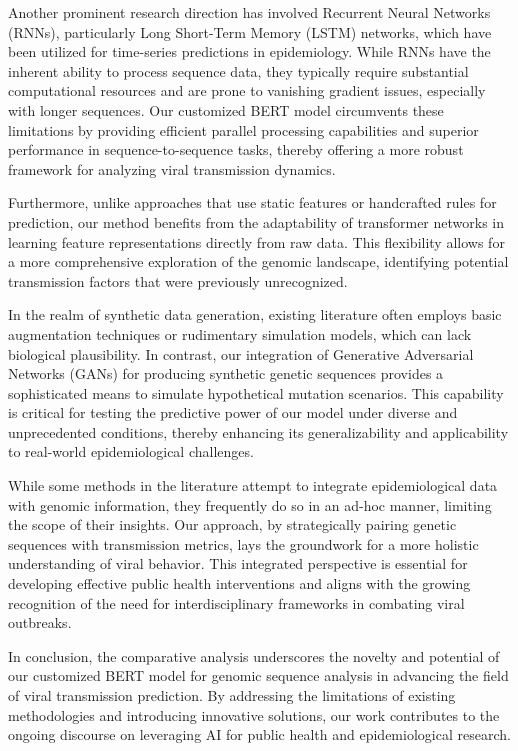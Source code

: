 \documentclass{article}
\begin{document}
Another prominent research direction has involved Recurrent Neural Networks (RNNs), particularly Long Short-Term Memory (LSTM) networks, which have been utilized for time-series predictions in epidemiology. While RNNs have the inherent ability to process sequence data, they typically require substantial computational resources and are prone to vanishing gradient issues, especially with longer sequences. Our customized BERT model circumvents these limitations by providing efficient parallel processing capabilities and superior performance in sequence-to-sequence tasks, thereby offering a more robust framework for analyzing viral transmission dynamics.

Furthermore, unlike approaches that use static features or handcrafted rules for prediction, our method benefits from the adaptability of transformer networks in learning feature representations directly from raw data. This flexibility allows for a more comprehensive exploration of the genomic landscape, identifying potential transmission factors that were previously unrecognized.

In the realm of synthetic data generation, existing literature often employs basic augmentation techniques or rudimentary simulation models, which can lack biological plausibility. In contrast, our integration of Generative Adversarial Networks (GANs) for producing synthetic genetic sequences provides a sophisticated means to simulate hypothetical mutation scenarios. This capability is critical for testing the predictive power of our model under diverse and unprecedented conditions, thereby enhancing its generalizability and applicability to real-world epidemiological challenges.

While some methods in the literature attempt to integrate epidemiological data with genomic information, they frequently do so in an ad-hoc manner, limiting the scope of their insights. Our approach, by strategically pairing genetic sequences with transmission metrics, lays the groundwork for a more holistic understanding of viral behavior. This integrated perspective is essential for developing effective public health interventions and aligns with the growing recognition of the need for interdisciplinary frameworks in combating viral outbreaks.

In conclusion, the comparative analysis underscores the novelty and potential of our customized BERT model for genomic sequence analysis in advancing the field of viral transmission prediction. By addressing the limitations of existing methodologies and introducing innovative solutions, our work contributes to the ongoing discourse on leveraging AI for public health and epidemiological research.
\end{document}
